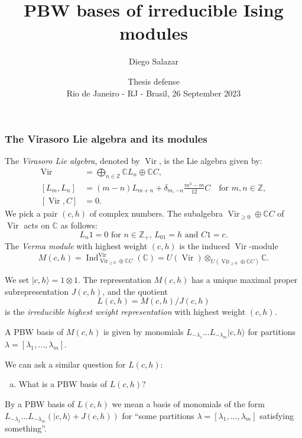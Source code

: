 \documentclass{beamer}
\title{PBW bases of irreducible Ising modules}
\author[Salazar]{Diego Salazar\inst{1}}
\institute[IMPA]{\inst{1}Instituto de Matemática Pura e Aplicada (IMPA)}
\date[26 September 2023]{Thesis defense \\
  Rio de Janeiro - RJ - Brasil, 26 September 2023}
\DeclareMathOperator{\Vir}{Vir}
\DeclareMathOperator{\Ind}{Ind}
\begin{document}
\maketitle

\begin{frame}
  \frametitle{The Virasoro Lie algebra and its modules}
  The \emph{Virasoro Lie algebra}, denoted by $\Vir$, is the Lie algebra given by:
  \begin{align*}
    \Vir &= \bigoplus_{n \in \mathbb{Z}}\mathbb{C}L_n \oplus \mathbb{C}C, \\
    [L_m, L_n] &= (m - n)L_{m + n} + \delta_{m, -n}\frac{m^3 - m}{12}C \quad \text{for $m, n \in \mathbb{Z}$}, \\
    [\Vir, C] &= 0.
  \end{align*}
  We pick a pair $(c, h)$ of complex numbers.
  The subalgebra $\Vir_{\ge 0} \oplus \mathbb{C}C$ of $\Vir$ acts on $\mathbb{C}$ as follows:
  \begin{equation*}
    \text{$L_n1 = 0$ for $n \in \mathbb{Z}_+$, $L_01 = h$ and $C1 = c$}.
  \end{equation*}
  The \emph{Verma module} with highest weight $(c, h)$ is the induced $\Vir$-module
  \begin{equation*}
    M(c, h) = \Ind^{\Vir}_{\Vir_{\ge 0} \oplus \mathbb{C}C}(\mathbb{C}) = U(\Vir) \otimes_{U(\Vir_{\ge 0} \oplus \mathbb{C}C)} \mathbb{C}.
  \end{equation*}
\end{frame}

\begin{frame}
  We set $|c, h\rangle = 1\otimes1$.
  The representation $M(c, h)$ has a unique maximal proper subrepresentation $J(c, h)$, and the quotient
  \begin{equation*}
    L(c, h) = M(c, h)/J(c, h)
  \end{equation*}
  is the \emph{irreducible highest weight representation} with highest weight $(c, h)$.

  \begin{theorem}
    \label{thr:1}
    A PBW basis of $M(c, h)$ is given by monomials $L_{-\lambda_1}\dots L_{-\lambda_m}|c, h\rangle$ for partitions $\lambda = [\lambda_1, \dots, \lambda_m]$.
  \end{theorem}

  We can ask a similar question for $L(c, h)$:
  \begin{enumerate}[(a)]
  \item What is a PBW basis of $L(c, h)$?
  \end{enumerate}
  By a PBW basis of $L(c, h)$ we mean a basis of monomials of the form $L_{-\lambda_1}\dots L_{-\lambda_m}(|c, h\rangle + J(c, h))$ for ``some partitions $\lambda = [\lambda_1, \dots, \lambda_m]$ satisfying something''.
\end{frame}
\end{document}
